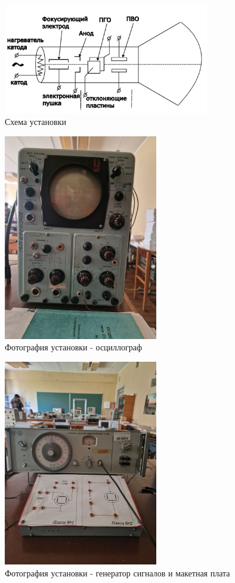 \begin{figure}[ht!]
\centering
\includegraphics[width=0.8\textwidth]{сложная схема.pdf}
\caption{Схема установки}
\label{fig:sketch}
\end{figure}

\begin{figure}[H]
\centering
\includegraphics[width=0.6\textwidth]{1.jpg}
\caption{Фотография установки - осциллограф}
\label{fig:device}
\end{figure}

\begin{figure}[H]
\centering
\includegraphics[width=0.6\textwidth]{2.jpg}
\caption{Фотография установки - генератор сигналов и макетная плата}
\label{fig:device}
\end{figure}


